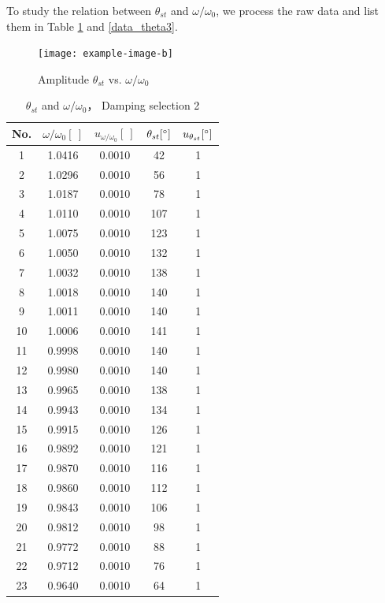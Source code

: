 To study the relation between $\theta_{st}$ and $\omega/\omega_0$, we process the raw data and list them in Table \ref{data_theta2} and \ref{data_theta3}.



\begin{figure}[H]
\centering
\texttt{[image: example-image-b]}
\caption{Amplitude $\theta_{st}$ vs. $\omega/\omega_0$}\label{theta}
\end{figure}






\begin{table}[H]
\centering
\begin{tabular}{|c|c|c|c|c|}
\hline
                No. & $\omega/\omega_0[\ ]$ & $u_{\omega/\omega_0}[\ ]$ & $\theta_{st}[^\circ]$ & $u_{\theta_{st}}[^\circ]$\\\hline
                1 & 1.0416 & 0.0010 & 42 & 1\\\hline
                2 & 1.0296 & 0.0010 & 56 & 1\\\hline
                3 & 1.0187 & 0.0010 & 78 & 1\\\hline
                4 & 1.0110 & 0.0010 & 107 & 1\\\hline
                5 & 1.0075 & 0.0010 & 123 & 1\\\hline
                6 & 1.0050 & 0.0010 & 132 & 1\\\hline
                7 & 1.0032 & 0.0010 & 138 & 1\\\hline
                8 & 1.0018 & 0.0010 & 140 & 1\\\hline
                9 & 1.0011 & 0.0010 & 140 & 1\\\hline
                10 & 1.0006 & 0.0010 & 141 & 1\\\hline
                11 & 0.9998 & 0.0010 & 140 & 1\\\hline
                12 & 0.9980 & 0.0010 & 140 & 1\\\hline
                13 & 0.9965 & 0.0010 & 138 & 1\\\hline
                14 & 0.9943 & 0.0010 & 134 & 1\\\hline
                15 & 0.9915 & 0.0010 & 126 & 1\\\hline
                16 & 0.9892 & 0.0010 & 121 & 1\\\hline
                17 & 0.9870 & 0.0010 & 116 & 1\\\hline
                18 & 0.9860 & 0.0010 & 112 & 1\\\hline
                19 & 0.9843 & 0.0010 & 106 & 1\\\hline
                20 & 0.9812 & 0.0010 & 98 & 1\\\hline
                21 & 0.9772 & 0.0010 & 88 & 1\\\hline
                22 & 0.9712 & 0.0010 & 76 & 1\\\hline
                23 & 0.9640 & 0.0010 & 64 & 1\\\hline
            \end{tabular}
            \caption{$\theta_{st}$ and $\omega/\omega_0$， Damping selection 2}\label{data_theta2}
        \end{table}


